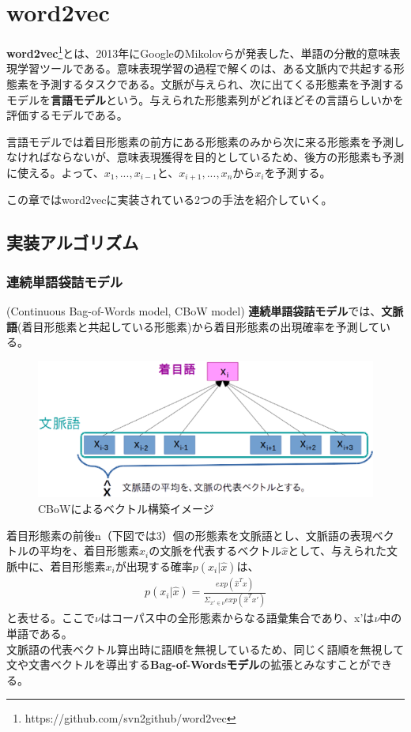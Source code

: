 \chapter{word2vec}
\textbf{word2vec}\footnote{https://github.com/svn2github/word2vec}とは、2013年にGoogleのMikolovらが発表した、単語の分散的意味表現学習ツールである。意味表現学習の過程で解くのは、ある文脈内で共起する形態素を予測するタスクである。文脈が与えられ、次に出てくる形態素を予測するモデルを\textbf{言語モデル}という。与えられた形態素列がどれほどその言語らしいかを評価するモデルである。

言語モデルでは着目形態素の前方にある形態素のみから次に来る形態素を予測しなければならないが、意味表現獲得を目的としているため、後方の形態素も予測に使える。よって、$x_1,...,x_{i-1}$と、$x_{i+1},...,x_n$から$x_i$を予測する。

この章ではword2vecに実装されている2つの手法を紹介していく。

\section{実装アルゴリズム}
\subsection{連続単語袋詰モデル}(Continuous Bag-of-Words model, CBoW model)
\textbf{連続単語袋詰モデル}では、\textbf{文脈語}(着目形態素と共起している形態素)から着目形態素の出現確率を予測している。
\begin{figure}[h]
  \centering
  \includegraphics[width=12.5cm]{../images/CBoW.eps}
  \caption{CBoWによるベクトル構築イメージ}
\end{figure}

着目形態素の前後n（下図では3）個の形態素を文脈語とし、文脈語の表現ベクトルの平均を、着目形態素$x_i$の文脈を代表するベクトル$\widehat{x}$として、与えられた文脈中に、着目形態素$x_i$が出現する確率$p(x_i|\widehat{x})$は、
\begin{eqnarray}
  \label{cbow_p}
  p(x_i|\widehat{x}) = \frac{exp(\widehat{x}^Tx)}{\Sigma_{x'\in\nu}exp(\widehat{x}^Tx')}
\end{eqnarray}
と表せる。ここで$\nu$はコーパス中の全形態素からなる語彙集合であり、x'は$\nu$中の単語である。\\
文脈語の代表ベクトル算出時に語順を無視しているため、同じく語順を無視して文や文書ベクトルを導出する\textbf{Bag-of-Wordsモデル}の拡張とみなすことができる。

